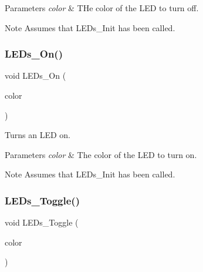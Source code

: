 \begin{DoxyParams}{Parameters}
{\em color} & T\+He color of the L\+ED to turn off. \\
\hline
\end{DoxyParams}
\begin{DoxyNote}{Note}
Assumes that L\+E\+Ds\+\_\+\+Init has been called. 
\end{DoxyNote}
\mbox{\label{group__main__module_ga1e5974ccd48f4e74eb3be78a51ebf16f}} 
\subsubsection{\texorpdfstring{L\+E\+Ds\+\_\+\+On()}{LEDs\_On()}}
{\footnotesize\ttfamily void L\+E\+Ds\+\_\+\+On (\begin{DoxyParamCaption}\item[{const \hyperlink{_l_e_ds_8h_a833ecccaa4c55e8365e84d6c02f92ec1}{T\+L\+ED}}]{color }\end{DoxyParamCaption})}



Turns an L\+ED on. 


\begin{DoxyParams}{Parameters}
{\em color} & The color of the L\+ED to turn on. \\
\hline
\end{DoxyParams}
\begin{DoxyNote}{Note}
Assumes that L\+E\+Ds\+\_\+\+Init has been called. 
\end{DoxyNote}
\mbox{\label{group__main__module_ga00b9c778cd7168ea0df402b263a609bb}} 
\subsubsection{\texorpdfstring{L\+E\+Ds\+\_\+\+Toggle()}{LEDs\_Toggle()}}
{\footnotesize\ttfamily void L\+E\+Ds\+\_\+\+Toggle (\begin{DoxyParamCaption}\item[{const \hyperlink{_l_e_ds_8h_a833ecccaa4c55e8365e84d6c02f92ec1}{T\+L\+ED}}]{color }\end{DoxyParamCaption})}



